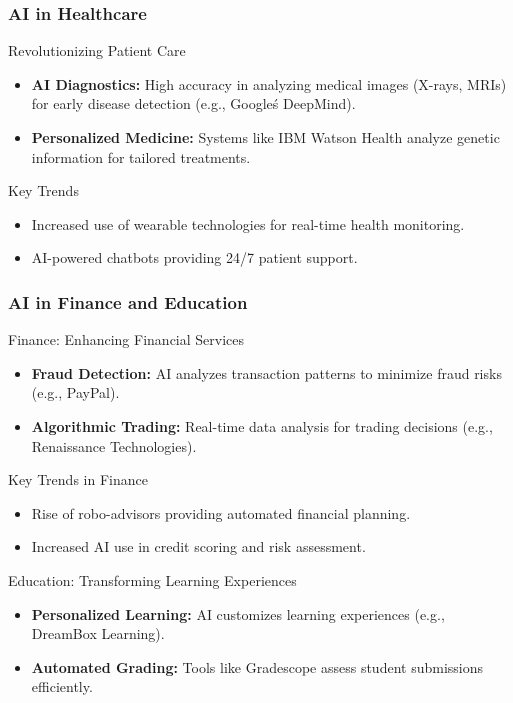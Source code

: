 \documentclass{beamer}
\begin{document}
\begin{frame}[fragile]
    \frametitle{AI in Healthcare}
    \begin{block}{Revolutionizing Patient Care}
        \begin{itemize}
            \item \textbf{AI Diagnostics:} High accuracy in analyzing medical images (X-rays, MRIs) for early disease detection (e.g., Google\'s DeepMind).
            \item \textbf{Personalized Medicine:} Systems like IBM Watson Health analyze genetic information for tailored treatments.
        \end{itemize}
    \end{block}
    
    \begin{block}{Key Trends}
        \begin{itemize}
            \item Increased use of wearable technologies for real-time health monitoring.
            \item AI-powered chatbots providing 24/7 patient support.
        \end{itemize}
    \end{block}
\end{frame}

\begin{frame}[fragile]
    \frametitle{AI in Finance and Education}
    \begin{block}{Finance: Enhancing Financial Services}
        \begin{itemize}
            \item \textbf{Fraud Detection:} AI analyzes transaction patterns to minimize fraud risks (e.g., PayPal).
            \item \textbf{Algorithmic Trading:} Real-time data analysis for trading decisions (e.g., Renaissance Technologies).
        \end{itemize}
    \end{block}
    
    \begin{block}{Key Trends in Finance}
        \begin{itemize}
            \item Rise of robo-advisors providing automated financial planning.
            \item Increased AI use in credit scoring and risk assessment.
        \end{itemize}
    \end{block}

    \begin{block}{Education: Transforming Learning Experiences}
        \begin{itemize}
            \item \textbf{Personalized Learning:} AI customizes learning experiences (e.g., DreamBox Learning).
            \item \textbf{Automated Grading:} Tools like Gradescope assess student submissions efficiently.
        \end{itemize}
    \end{block}
\end{frame}
\end{document}
